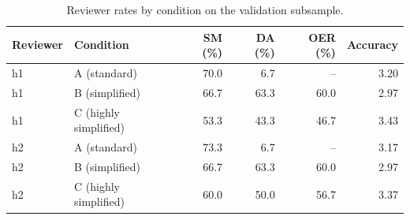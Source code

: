 \begin{table}[H]
\caption{Reviewer rates by condition on the validation subsample.}
\label{tab:reviewer:rates}
\centering
\begin{tabular}{llrrrr}
\toprule
Reviewer & Condition & SM (\%) & DA (\%) & OER (\%) & Accuracy \\
\midrule
h1 & A (standard) & 70.0 & 6.7 & -- & 3.20 \\
h1 & B (simplified) & 66.7 & 63.3 & 60.0 & 2.97 \\
h1 & C (highly simplified) & 53.3 & 43.3 & 46.7 & 3.43 \\
h2 & A (standard) & 73.3 & 6.7 & -- & 3.17 \\
h2 & B (simplified) & 66.7 & 63.3 & 60.0 & 2.97 \\
h2 & C (highly simplified) & 60.0 & 50.0 & 56.7 & 3.37 \\
\bottomrule
\end{tabular}
\end{table}
